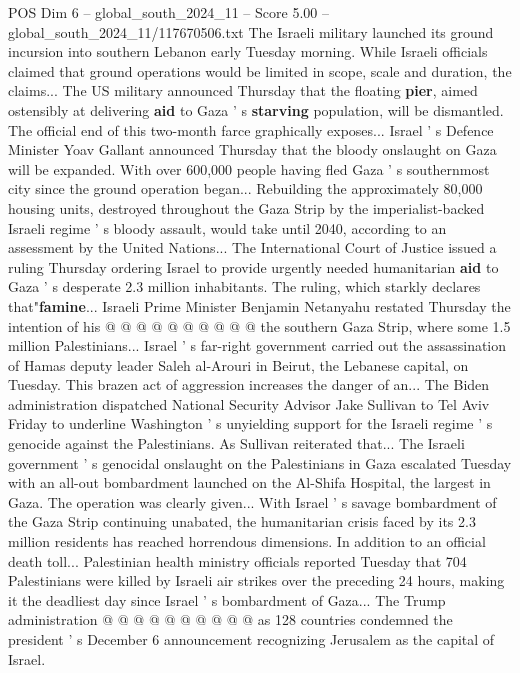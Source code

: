 \begin{textsample}{POS Dim 6 – global\_south\_2024\_11 – Score 5.00 – global\_south\_2024\_11/117670506.txt}  \label{ex:f6_pos_333}
The Israeli military launched its ground incursion into southern Lebanon early Tuesday morning.
While Israeli officials claimed that ground operations would be limited in scope, scale and duration, the claims...
The US military announced Thursday that the floating \textbf{pier}, aimed ostensibly at delivering \textbf{aid} to Gaza ' s \textbf{starving} population, will be dismantled.
The official end of this two-month farce graphically exposes...
Israel ' s Defence Minister Yoav Gallant announced Thursday that the bloody onslaught on Gaza will be expanded.
With over 600,000 people having fled Gaza ' s southernmost city since the ground operation began...
Rebuilding the approximately 80,000 housing units, destroyed throughout the Gaza Strip by the imperialist-backed Israeli regime ' s bloody assault, would take until 2040, according to an assessment by the United Nations...
The International Court of Justice issued a ruling Thursday ordering Israel to provide urgently needed humanitarian \textbf{aid} to Gaza ' s desperate 2.3 million inhabitants.
The ruling, which starkly declares that"\textbf{famine}...
Israeli Prime Minister Benjamin Netanyahu restated Thursday the intention of his @ @ @ @ @ @ @ @ @ @ the southern Gaza Strip, where some 1.5 million Palestinians...
Israel ' s far-right government carried out the assassination of Hamas deputy leader Saleh al-Arouri in Beirut, the Lebanese capital, on Tuesday.
This brazen act of aggression increases the danger of an...
The Biden administration dispatched National Security Advisor Jake Sullivan to Tel Aviv Friday to underline Washington ' s unyielding support for the Israeli regime ' s genocide against the Palestinians.
As Sullivan reiterated that...
The Israeli government ' s genocidal onslaught on the Palestinians in Gaza escalated Tuesday with an all-out bombardment launched on the Al-Shifa Hospital, the largest in Gaza.
The operation was clearly given...
With Israel ' s savage bombardment of the Gaza Strip continuing unabated, the humanitarian crisis faced by its 2.3 million residents has reached horrendous dimensions.
In addition to an official death toll...
Palestinian health ministry officials reported Tuesday that 704 Palestinians were killed by Israeli air strikes over the preceding 24 hours, making it the deadliest day since Israel ' s bombardment of Gaza...
The Trump administration @ @ @ @ @ @ @ @ @ @ as 128 countries condemned the president ' s December 6 announcement recognizing Jerusalem as the capital of Israel.

\end{textsample}
